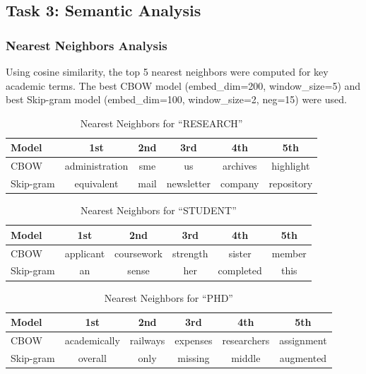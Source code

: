 \documentclass[12pt,a4paper]{article}
\begin{document}
\subsection{Task 3: Semantic Analysis}

\subsubsection{Nearest Neighbors Analysis}

Using cosine similarity, the top 5 nearest neighbors were computed for key academic terms. The best CBOW model (embed\_dim=200, window\_size=5) and best Skip-gram model (embed\_dim=100, window\_size=2, neg=15) were used.

\begin{table}[H]
\centering
\caption{Nearest Neighbors for ``RESEARCH''}
\begin{tabular}{@{}lccccc@{}}
\toprule
\textbf{Model} & \textbf{1st} & \textbf{2nd} & \textbf{3rd} & \textbf{4th} & \textbf{5th} \\
\midrule
CBOW & administration & sme & us & archives & highlight \\
Skip-gram & equivalent & mail & newsletter & company & repository \\
\bottomrule
\end{tabular}
\end{table}

\begin{table}[H]
\centering
\caption{Nearest Neighbors for ``STUDENT''}
\begin{tabular}{@{}lccccc@{}}
\toprule
\textbf{Model} & \textbf{1st} & \textbf{2nd} & \textbf{3rd} & \textbf{4th} & \textbf{5th} \\
\midrule
CBOW & applicant & coursework & strength & sister & member \\
Skip-gram & an & sense & her & completed & this \\
\bottomrule
\end{tabular}
\end{table}

\begin{table}[H]
\centering
\caption{Nearest Neighbors for ``PHD''}
\begin{tabular}{@{}lccccc@{}}
\toprule
\textbf{Model} & \textbf{1st} & \textbf{2nd} & \textbf{3rd} & \textbf{4th} & \textbf{5th} \\
\midrule
CBOW & academically & railways & expenses & researchers & assignment \\
Skip-gram & overall & only & missing & middle & augmented \\
\bottomrule
\end{tabular}
\end{table}
\end{document}
